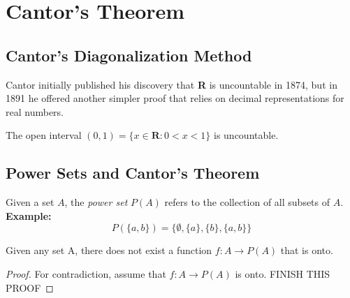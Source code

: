 \section{Cantor's Theorem}
    \subsection*{Cantor's Diagonalization Method}
        Cantor initially published his discovery that \textbf{R} is uncountable in 1874, but in 1891 he offered another simpler proof that relies on decimal representations for real numbers.
        \begin{theorem}
            The open interval $(0, 1) = \{x \in \textbf{R}: 0 < x < 1\}$ is uncountable.
        \end{theorem} 
    \subsection*{Power Sets and Cantor's Theorem}
        Given a set $A$, the \textit{power set} $P(A)$ refers to the collection of all subsets of $A$.
        \textbf{Example:}
        \begin{equation*}
            P(\{a, b\}) = \{\emptyset, \{a\}, \{b\}, \{a, b\}\}
        \end{equation*}
        \begin{theorem}
            Given any set A, there does not exist a function $f: A \rightarrow P(A)$ that is onto.
        \end{theorem}
        \begin{proof}
            For contradiction, assume that $f: A \rightarrow P(A)$ is onto.
            FINISH THIS PROOF
        \end{proof}